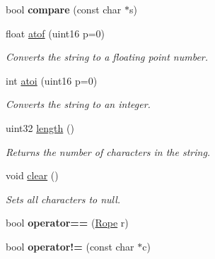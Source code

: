 \begin{DoxyCompactItemize}
\item 
\hypertarget{classetk_1_1_static_string_a0ed58658bfa5e77ca4609fa213d6fc0d}{bool {\bfseries compare} (const char $\ast$s)}\label{classetk_1_1_static_string_a0ed58658bfa5e77ca4609fa213d6fc0d}

\item 
float \hyperlink{classetk_1_1_static_string_afd19d4edc8dd7c8439129268c4cf5eee}{atof} (uint16 p=0)
\begin{DoxyCompactList}\small\item\em Converts the string to a floating point number. \end{DoxyCompactList}\item 
int \hyperlink{classetk_1_1_static_string_ac250c25e8e6ebadb802e48702abbc3cb}{atoi} (uint16 p=0)
\begin{DoxyCompactList}\small\item\em Converts the string to an integer. \end{DoxyCompactList}\item 
\hypertarget{classetk_1_1_static_string_a30f58ade28fd14f3c30c42147cc8245f}{uint32 \hyperlink{classetk_1_1_static_string_a30f58ade28fd14f3c30c42147cc8245f}{length} ()}\label{classetk_1_1_static_string_a30f58ade28fd14f3c30c42147cc8245f}

\begin{DoxyCompactList}\small\item\em Returns the number of characters in the string. \end{DoxyCompactList}\item 
\hypertarget{classetk_1_1_static_string_a5ddc4131a3eb881f56860cd563d1e537}{void \hyperlink{classetk_1_1_static_string_a5ddc4131a3eb881f56860cd563d1e537}{clear} ()}\label{classetk_1_1_static_string_a5ddc4131a3eb881f56860cd563d1e537}

\begin{DoxyCompactList}\small\item\em Sets all characters to null. \end{DoxyCompactList}\item 
\hypertarget{classetk_1_1_static_string_a21e9cc28db85354111ec1081e4f96400}{bool {\bfseries operator==} (\hyperlink{classetk_1_1_rope}{Rope} r)}\label{classetk_1_1_static_string_a21e9cc28db85354111ec1081e4f96400}

\item 
\hypertarget{classetk_1_1_static_string_aa9905dea14fe61bbb43074b6844c1715}{bool {\bfseries operator!=} (const char $\ast$c)}\label{classetk_1_1_static_string_aa9905dea14fe61bbb43074b6844c1715}


\end{DoxyCompactItemize}
